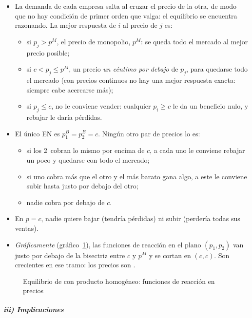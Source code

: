 \documentclass[11pt]{article}
\begin{document}
\begin{itemize}
\item La demanda de cada empresa salta al cruzar el precio de la otra, de modo que no hay condición de primer orden que valga: el equilibrio se encuentra razonando. La mejor respuesta de $i$ al precio de $j$ es:
  \begin{itemize}
  \item si $p_j>p^M$, el precio de monopolio, $p^M$: se queda todo el mercado al mejor precio posible;
  \item si $c<p_j\leq p^M$, un precio \emph{un céntimo por debajo} de $p_j$, para quedarse todo el mercado (con precios continuos no hay una mejor respuesta exacta: siempre cabe acercarse más);
  \item si $p_j\leq c$, no le conviene vender: cualquier $p_i\geq c$ le da un beneficio nulo, y rebajar le daría pérdidas.
  \end{itemize}
\item El único EN es $p_1^B=p_2^B=c$\nocite{MasColellWhinstonGreen1995}. Ningún otro par de precios lo es:
  \begin{itemize}
  \item si los 2~cobran lo mismo por encima de $c$, a cada uno le conviene rebajar un poco y quedarse con todo el mercado;
  \item si uno cobra más que el otro y el más barato gana algo, a este le conviene subir hasta justo por debajo del otro;
  \item nadie cobra por debajo de $c$.
  \end{itemize}
\item En $p=c$, nadie quiere bajar (tendría pérdidas) ni subir (perdería todas sus ventas).
\item \emph{Gráficamente} (gráfico~\ref{fig:bertrand}), las funciones de reacción en el plano $(p_1,p_2)$ van justo por debajo de la bisectriz entre $c$ y $p^M$ y se cortan en $(c,c)$. Son crecientes en ese tramo: los precios son .
\end{itemize}

\begin{figure}[H]
\centering
\caption{Equilibrio de  con producto homogéneo: funciones de reacción en precios}\label{fig:bertrand}
\end{figure}

\subparagraph{iii) Implicaciones}
\end{document}
